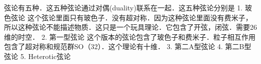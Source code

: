 弦论有五种．这五种弦论通过对偶(duality)联系在一起．这五种弦论分别是
1. 玻色弦论
这个弦论里面只有玻色子．没有超对称．因为这种弦论里面没有费米子，所以这种弦论不能描述物质．这只是一个玩具理论．它包含了开弦，闭弦．需要26维的时空．
2. 第一型弦论
这个版本的弦论包含了玻色子和费米子．粒子相互作用包含了超对称和规范群SO（32）．这个理论有十维．
3. 第二A型弦论
4. 第二B型弦论
5. Heterotic弦论
